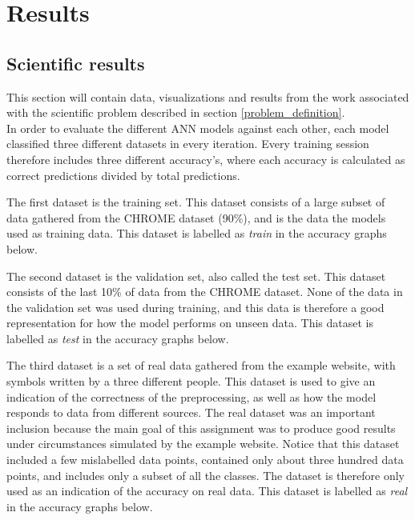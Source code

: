\chapter{Results}

\section{Scientific results}
This section will contain data, visualizations and results from the work associated with the scientific problem described in section \ref{problem_definition}.\\
In order to evaluate the different ANN models against each other, each model classified three different datasets in every iteration. Every training session therefore includes three different accuracy's, where each accuracy is calculated as correct predictions divided by total predictions.

The first dataset is the training set. This dataset consists of a large subset of data gathered from the CHROME dataset (90\%), and is the data the models used as training data. This dataset is labelled as \textit{train} in the accuracy graphs below. %

The second dataset is the validation set, also called the test set. This dataset consists of the last 10\% of data from the CHROME dataset. None of the data in the validation set was used during training, and this data is therefore a good representation for how the model performs on unseen data. This dataset is labelled as \textit{test} in the accuracy graphs below.

The third dataset is a set of real data gathered from the example website, with symbols written by a three different people. This dataset is used to give an indication of the correctness of the preprocessing, as well as how the model responds to data from different sources. The real dataset was an important inclusion because the main goal of this assignment was to produce good results under circumstances simulated by the example website. Notice that this dataset included a few mislabelled data points, contained only about three hundred data points, and includes only a subset of all the classes. The dataset is therefore only used as an indication of the accuracy on real data. This dataset is labelled as \textit{real} in the accuracy graphs below.

